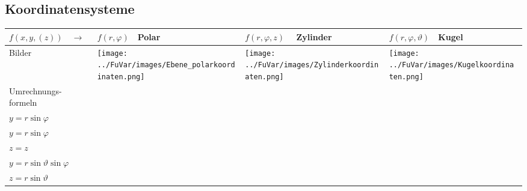 \subsection{Koordinatensysteme}
\begin{tabular}{|p{2.5cm}||p{3cm}|p{4.2cm}|p{7.5cm}|}
	\hline
	$f(x,y,(z))\quad\rightarrow$ &
	\begin{minipage}{2.4cm}
    	\vspace{0.1cm}
		$f(r,\varphi)\quad$\textbf{Polar} 
    	\vspace{0.1cm}    	
    \end{minipage}& 
	$f(r,\varphi,z)\quad$ \textbf{Zylinder} &
	$f(r,\varphi,\vartheta)\quad$\textbf{Kugel}\\
	\hline
	\hline
	Bilder &
	\begin{minipage}{3cm}
    	\texttt{[image: ../FuVar/images/Ebene\_polarkoordinaten.png]}
    \end{minipage}&
	\begin{minipage}{3cm}
    	\texttt{[image: ../FuVar/images/Zylinderkoordinaten.png]}
    \end{minipage}&
	\begin{minipage}{3cm}
    	\texttt{[image: ../FuVar/images/Kugelkoordinaten.png]}
    \end{minipage}\\
	\hline
	Umrechnungs- formeln &
	\begin{minipage}{3cm}
    \vspace{0.1cm}
		$x=r\cos\varphi$\\
		$y=r\sin\varphi$    
    \vspace{0.1cm}
    \end{minipage}&	
	\begin{minipage}{4.2cm}
    \vspace{0.1cm}
    	$x=r\cos\varphi$\\
    	$y=r\sin\varphi$\\
    	$z=z$
    \vspace{0.1cm}
    \end{minipage}&	
	\begin{minipage}{7.5cm}
    \vspace{0.1cm}
    	$x=r\sin\vartheta\cos\varphi$\\
    	$y=r\sin\vartheta\sin\varphi$\\
    	$z=r\sin\vartheta$
    \vspace{0.1cm}
    \end{minipage}\\

\end{tabular}
